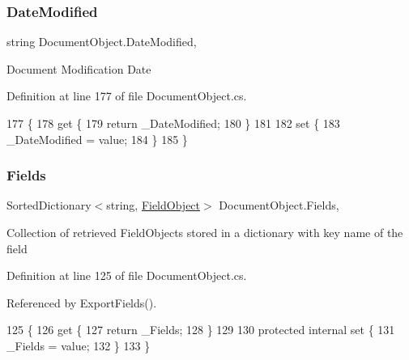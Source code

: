 \subsubsection{\texorpdfstring{Date\+Modified}{DateModified}}
{\footnotesize\ttfamily string Document\+Object.\+Date\+Modified\hspace{0.3cm}{\ttfamily [get]}, {\ttfamily [set]}}



Document Modification Date 



Definition at line 177 of file Document\+Object.\+cs.


\begin{DoxyCode}
177                                \{
178         \textcolor{keyword}{get} \{
179             \textcolor{keywordflow}{return} \_DateModified;
180         \}
181 
182         \textcolor{keyword}{set} \{
183             \_DateModified = value;
184         \}
185     \}
\end{DoxyCode}
\mbox{\label{class_document_object_ae203b8a3e40b6c428145d2335b71245c}} 
\subsubsection{\texorpdfstring{Fields}{Fields}}
{\footnotesize\ttfamily Sorted\+Dictionary$<$string, \mbox{\hyperlink{class_field_object}{Field\+Object}}$>$ Document\+Object.\+Fields\hspace{0.3cm}{\ttfamily [get]}, {\ttfamily [set]}}



Collection of retrieved Field\+Objects stored in a dictionary with key name of the field 



Definition at line 125 of file Document\+Object.\+cs.



Referenced by Export\+Fields().


\begin{DoxyCode}
125                                                         \{
126         \textcolor{keyword}{get} \{
127             \textcolor{keywordflow}{return} \_Fields;
128         \}
129 
130         \textcolor{keyword}{protected} \textcolor{keyword}{internal} \textcolor{keyword}{set} \{
131             \_Fields = value;
132         \}
133     \}
\end{DoxyCode}
\mbox{\label{class_document_object_afe6bcf5175607f91dde768491f23a0a4}} 
